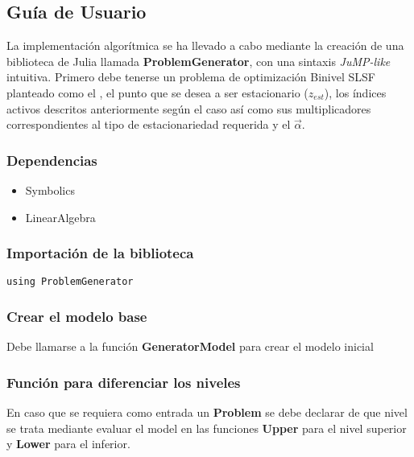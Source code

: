 \subsection{Guía de Usuario}
La implementación algorítmica se ha llevado a cabo mediante la creación de una biblioteca de Julia
llamada \textbf{ProblemGenerator}, con una sintaxis \textit{JuMP-like} intuitiva.
Primero debe tenerse un problema de optimización Binivel SLSF planteado como el , el punto que se desea a ser estacionario ($z_{est}$), los índices activos descritos anteriormente 
según el caso así como sus multiplicadores correspondientes al tipo de estacionariedad requerida y el $\vec{\alpha}$.

\subsubsection{Dependencias}
\begin{itemize}
    \item Symbolics 
    \item LinearAlgebra
\end{itemize}

\subsubsection{Importación de la biblioteca}

\begin{lstlisting}[caption=Importar el Módulo]
    using ProblemGenerator
\end{lstlisting}

\subsubsection{Crear el modelo base}
Debe llamarse a la función \textbf{GeneratorModel} para crear el modelo 
inicial 

\subsubsection{Función para diferenciar los niveles}
En caso que se requiera como entrada un \textbf{Problem} se debe declarar
de que nivel se trata mediante evaluar el model en las funciones \textbf{Upper} para el nivel 
superior y \textbf{Lower} para el inferior.


